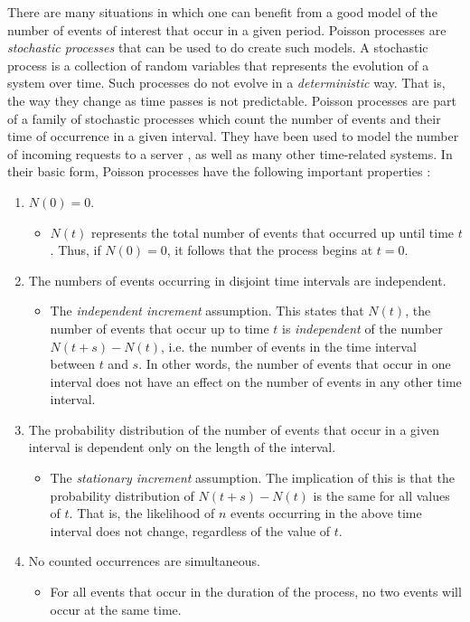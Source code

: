 \documentclass[a4paper,11pt]{article}
\begin{document}
   There are many situations in which one can benefit from a good model of the
   number of events of interest that occur in a given period. Poisson processes
   are \emph{stochastic processes} that can be used to do create such models. A
   stochastic process is a collection of random variables that represents the
   evolution of a system over time. Such processes do not evolve in a
   \emph{deterministic} way. That is, the way they change as time passes is not
   predictable. Poisson processes are part of a family of stochastic processes
   which count the number of events and their time of occurrence in a given
   interval. They have been used to model the number of incoming requests to a
   server \cite{arlitt1997internet}, as well as many other time-related
   systems. In their basic form, Poisson processes have the following important
   properties \cite{ross1997simulation}:
\begin{enumerate}
\item $N(0)=0$.
\begin{itemize}
\item $N(t)$ represents the total number of events that occurred up until time
     $t$. Thus, if $N(0)=0$, it follows that the process begins at $t=0$.
\end{itemize}
\item The numbers of events occurring in disjoint time intervals are independent.
\begin{itemize}
\item The \emph{independent increment} assumption. This states that $N(t)$, the
     number of events that occur up to time $t$ is \emph{independent} of the
     number $N(t+s)-N(t)$, i.e. the number of events in the time interval
     between $t$ and $s$. In other words, the number of events that occur in one
     interval does not have an effect on the number of events in any other time
     interval.
\end{itemize}
\item The probability distribution of the number of events that occur in a given
   interval is dependent only on the length of the interval.
\begin{itemize}
\item The \emph{stationary increment} assumption. The implication of this is that
     the probability distribution of $N(t+s)-N(t)$ is the same for all values of
     $t$. That is, the likelihood of $n$ events occurring in the above time
     interval does not change, regardless of the value of $t$.
\end{itemize}
\item No counted occurrences are simultaneous.
\begin{itemize}
\item For all events that occur in the duration of the process, no two events
     will occur at the same time.
\end{itemize}
\end{enumerate}
\end{document}
